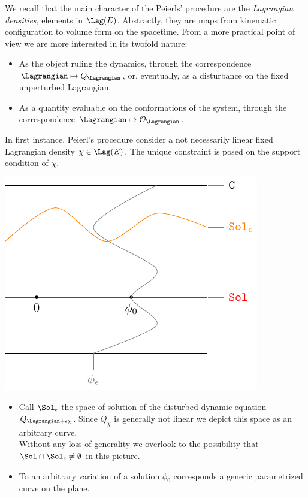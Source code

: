 \documentclass[Main]{subfiles}
\begin{document}
		We recall that the main character of the Peierls' procedure are the \emph{Lagrangian densities}, elements in $\Lag(E)$.
		Abstractly, they are maps from kinematic configuration to volume form on the spacetime. From a more practical point of view we are more interested in its twofold nature:
		\begin{itemize}
			\item As the object ruling the dynamics, through the correspondence $\Lagrangian \mapsto Q_\Lagrangian$, or, eventually, as a disturbance on the fixed unperturbed Lagrangian.
			\item As a quantity evaluable on the conformations of the system, through the correspondence  $\Lagrangian \mapsto  \mathcal{O}_\Lagrangian$.
		\end{itemize}
		
		In first instance, Peierl's procedure consider a not necessarily linear fixed Lagrangian density $\chi\in \Lag(E)$. The unique constraint is posed on the support condition of $\chi$.\\
		\vspace{1mm}		
		\begin{minipage}{0.5\textwidth}
			\includegraphics[width=\textwidth]{Pictures/GeometricPicture1}
		\end{minipage}
		\begin{minipage}{0.5\textwidth}
			\begin{itemize}
				\item Call $\Sol_\epsilon$ the space of solution of the disturbed dynamic equation $Q_{\Lagrangian + \epsilon \chi}$.
					Since $Q_\chi$ is generally not linear we depict this space as an arbitrary curve.\\
					Without any loss of generality we  overlook to the possibility that $\Sol \cap \Sol_\epsilon \neq \emptyset$ in this picture.
				\item To an arbitrary variation of a solution $\phi_0$ corresponds a generic parametrized curve on the plane.
			\end{itemize}
		\end{minipage}
\end{document}
